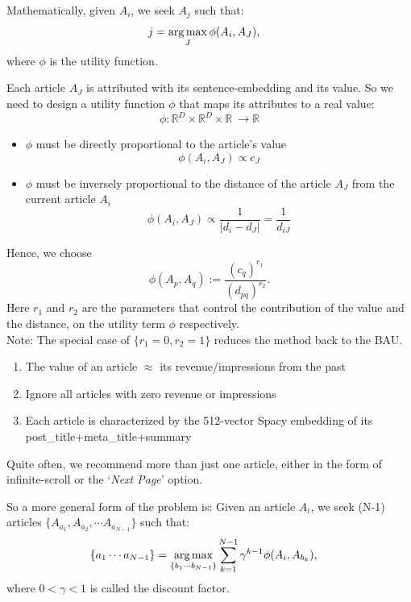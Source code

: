 \documentclass[11]{article}
\begin{document}
Mathematically, given $A_i$, we seek $A_j$ such that:
\begin{align*}
 j&= \operatorname*{arg\,max}_J   \phi(A_i, A_{J}) ,
\end{align*}
where $\phi$ is the utility function.


Each article $A_J$ is attributed with its sentence-embedding and its value. So we need to design a utility function $\phi$ that maps its attributes to a real value:
\[ \phi: \mathbb{R}^D\times\mathbb{R}^D\times\mathbb{R}\ \to \mathbb{R} \]

\begin{itemize}
\item $\phi$ must be directly proportional to the  article's value \[ \phi(A_i, A_{J})  \propto c_J \]
\item $\phi$ must be inversely proportional to the  distance of the article $A_J$ from the current article $A_i$ \[ \phi(A_i, A_{J})  \propto \frac{1}{|d_i-d_J|} =\frac{1}{d_{iJ}} \]
\end{itemize}

Hence, we choose $$\phi(A_p, A_{q}):=\dfrac{(c_{q})^{r_1}}{(d_{pq})^{r_2}}.$$ Here $r_1$ and $r_2$ are the parameters that control the contribution of the value and the distance, on the utility term $\phi$ respectively. \\Note: The special case of $\{r_1=0, r_2=1 \}$ reduces the method back to the BAU.

\begin{enumerate}
\item The value of an article $\approx$ its revenue/impressions from the past
\item Ignore all articles with zero revenue or impressions
\item Each article is characterized by the 512-vector Spacy embedding of its post\_title+meta\_title+summary
\end{enumerate}


 Quite often, we recommend more than just one article, either in the form of infinite-scroll or the `\textit{Next Page}' option.

So a more general form of the problem is:
Given an article $A_i$, we seek (N-1) articles $\{A_{a_1}, A_{a_2}, \cdots A_{a_{N-1}}\}$ such that:
\begin{align*}
\{a_1 \cdots a_{N-1}\} &= \operatorname*{arg\,max}_{\{b_1\cdots b_{{N-1}}\}}  \sum_{k=1}^{N-1}  \gamma^{k-1} \phi(A_i, A_{b_k}),
\end{align*}
where $0<\gamma<1$ is called the discount factor.
\end{document}
